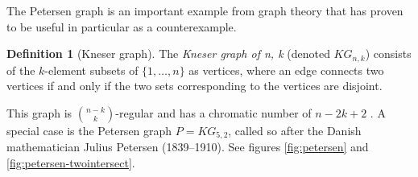 \documentclass[12pt,            %
               a4paper,         %
               oneside,         %
               DIV12,           %
               fleqn,           %
               halfparskip,     %
               nochapterprefix, %
               bibtotocnumbered,%
              ]{scrartcl} %
\theoremstyle{definition}
\newtheorem{definition}{Definition}
\begin{document}
The Petersen graph is an important example from graph theory that has
proven to be useful in particular as a counterexample.

\begin{definition}[Kneser graph]
  The \emph{Kneser graph of n, k} (denoted $KG_{n,k}$) consists of
  the $k$-element subsets of $\{1,\ldots,n\}$ as vertices, where an
  edge connects two vertices if and only if the two sets corresponding
  to the vertices are disjoint.
\end{definition}

This graph is ${n-k}\choose k$-regular and has a chromatic number of
$n - 2k + 2$ \cite{kneser}. A special case is the Petersen graph $P =
KG_{5,2}$, called so after the Danish mathematician Julius Petersen
(1839--1910). See figures \ref{fig:petersen} and
\ref{fig:petersen-twointersect}.
\end{document}
